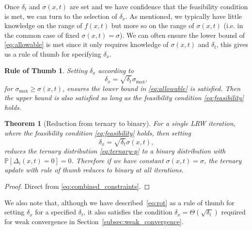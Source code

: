 \documentclass[pra,showpacs,amsmath,amssymb,amsfonts,lengthcheck,longbibliography,onecolumn]{revtex4-2}
\newtheorem{theorem}{Theorem}
\newtheorem*{rot}{Rule of Thumb}
\begin{document}
Once $\delta_t$ and $\sigma(x,t)$ are set and we have confidence that the feasibility condition is met, we can turn to the selection of $\delta_x$. As mentioned, we typically have little knowledge on the range of $f(x,t)$ but more so on the range of $\sigma(x,t)$ (i.e. in the common case of fixed $\sigma(x,t) = \sigma$). We can often ensure the lower bound of \eqref{eq:allowable} is met since it only requires knowledge of $\sigma(x,t)$ and $\delta_t$, this gives us a rule of thumb for specifying $\delta_x$.
\begin{rot}Setting $\delta_x$ according to
\begin{equation}\label{eq:rot}
    \delta_x = \sqrt{\delta_t} \sigma_\text{max},
\end{equation}
for $\sigma_\text{max} \geq \sigma(x,t)$, ensures the lower bound in \eqref{eq:allowable} is satisfied. Then the upper bound is also satisfied so long as the feasibility condition \eqref{eq:feasibility} holds.
\end{rot}


\begin{theorem}[Reduction from ternary to binary]
    For a single LRW iteration, where the feasibility condition \eqref{eq:feasibility} holds, then setting
    \begin{equation*}
        \delta_x = \sqrt{\delta_t} \sigma(x,t),
    \end{equation*}
    reduces the ternary distribution \eqref{eq:ternary-p} to a binary distribution with $\mathbb{P}[\Delta_i(x, t) = 0] = 0$.
    Therefore if we have constant $\sigma(x,t)=\sigma$, the ternary update with rule of thumb reduces to binary at all iterations.
\end{theorem}
\begin{proof}
    Direct from \eqref{eq:combined_constraints}.
\end{proof}


We also note that, although we have described~\eqref{eq:rot} as a rule of thumb for setting
$\delta_x$ for a specified $\delta_t$, it also satisfies the condition
$\delta_x = \Theta(\sqrt{\delta_t})$ required for weak convergence in Section~\ref{subsec:weak_convergence}.
\end{document}
